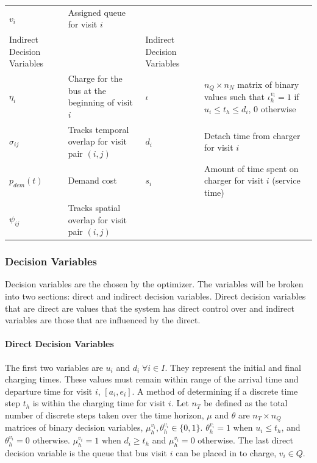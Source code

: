 \documentclass[11pt,a4paper,final]{article}
\newcommand{\Iset}{I}                       %
\newcommand{\Qset}{Q}                       %
\begin{document}
\begin{table}[htbp]
\begin{tabularx}{\textwidth}{L{0.3} L{1.2} L{0.3} L{1.2}}
\(v_i\) & Assigned queue for visit \(i\) &  & \\[0pt]
Indirect Decision Variables &  & Indirect Decision Variables & \\[0pt]
\(\eta_i\) & Charge for the bus at the beginning of visit \(i\) & \(\iota\) & \(n_Q \times n_N\) matrix of binary values such that \(\iota_h^{v_i} = 1\) if \(u_i \le t_h \le d_i\), 0 otherwise\\[0pt]
\(\sigma_{ij}\) & Tracks temporal overlap for visit pair \((i,j)\) & \(d_i\) & Detach time from charger for visit \(i\)\\[0pt]
\(p_{dem}(t)\) & Demand cost & \(s_i\) & Amount of time spent on charger for visit \(i\) (service time)\\[0pt]
\(\psi_{ij}\) & Tracks spatial overlap for visit pair \((i,j)\) &  & \\[0pt]
\hline
\end{tabularx}
\end{table}

\subsubsection{Decision Variables}
\label{sec:decision-variables}
Decision variables are the chosen by the optimizer. The variables will be broken into two sections: direct and indirect
decision variables. Direct decision variables that are direct are values that the system has direct control over and
indirect variables are those that are influenced by the direct.

\paragraph{Direct Decision Variables}
\label{sec:direct-decision-variables}
The first two variables are \(u_i\) and \(d_i \; \forall i \in \Iset\). They represent the initial and final charging times. These
values must remain within range of the arrival time and departure time for visit \(i\), \([a_i, e_i]\). A method of
determining if a discrete time step \(t_h\) is within the charging time for visit \(i\). Let \(n_T\) be defined as the total
number of discrete steps taken over the time horizon, \(\mu\) and \(\theta\) are \(n_T \times n_Q\) matrices of binary decision variables,
\(\mu_h^{v_i}, \theta_h^{v_i} \in \{0, 1\}\). \(\theta_h^{v_i} = 1\) when \(u_i \le t_h\), and \(\theta_h^{v_i} = 0\) otherwise. \(\mu_h^{v_i} = 1\)
when \(d_i \ge t_h\) and \(\mu_h^{v_i} = 0\) otherwise. The last direct decision variable is the queue that bus visit \(i\) can
be placed in to charge, \(v_i \in \Qset\).
\end{document}
